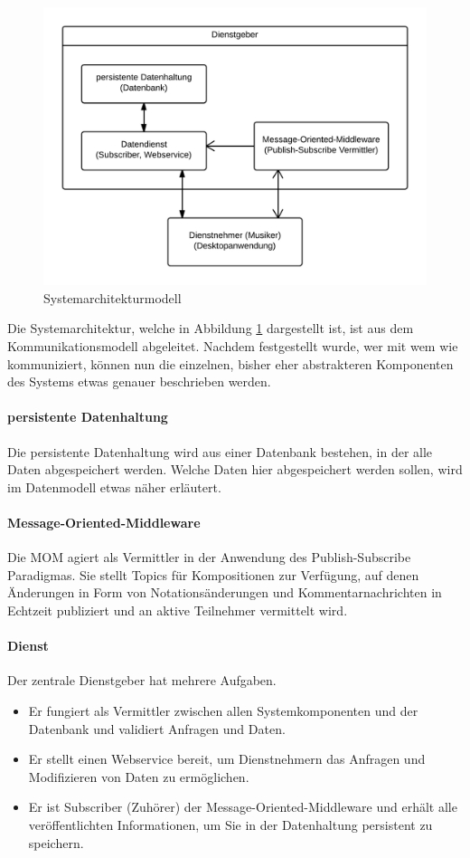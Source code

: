 \documentclass[12pt]{scrartcl}
\begin{document}
\begin{figure}
\centering
\includegraphics[scale=.25]{figures/systemarchitekturmodell}
\caption{Systemarchitekturmodell}
\label{fig:systemarchitekturmodell}
\end{figure}

Die Systemarchitektur, welche in Abbildung \ref{fig:systemarchitekturmodell} dargestellt ist, ist aus dem Kommunikationsmodell abgeleitet. Nachdem festgestellt wurde, wer mit wem wie kommuniziert, können nun die einzelnen, bisher eher abstrakteren Komponenten des Systems etwas genauer beschrieben werden.

\paragraph{persistente Datenhaltung}
Die persistente Datenhaltung wird aus einer Datenbank bestehen, in der alle Daten abgespeichert werden. Welche Daten hier abgespeichert werden sollen, wird im Datenmodell etwas näher erläutert.

\paragraph{Message-Oriented-Middleware}
Die MOM agiert als Vermittler in der Anwendung des Publish-Subscribe Paradigmas. Sie stellt Topics für Kompositionen zur Verfügung, auf denen Änderungen in Form von Notationsänderungen und Kommentarnachrichten in Echtzeit publiziert und an aktive Teilnehmer vermittelt wird.

\paragraph{Dienst}
Der zentrale Dienstgeber hat mehrere Aufgaben.
\begin{itemize}
\item Er fungiert als Vermittler zwischen allen Systemkomponenten und der Datenbank und validiert Anfragen und Daten.
\item Er stellt einen Webservice bereit, um Dienstnehmern das Anfragen und Modifizieren von Daten zu ermöglichen.
\item Er ist Subscriber (Zuhörer) der Message-Oriented-Middleware und erhält alle veröffentlichten Informationen, um Sie in der Datenhaltung persistent zu speichern.
\end{itemize}
\end{document}
